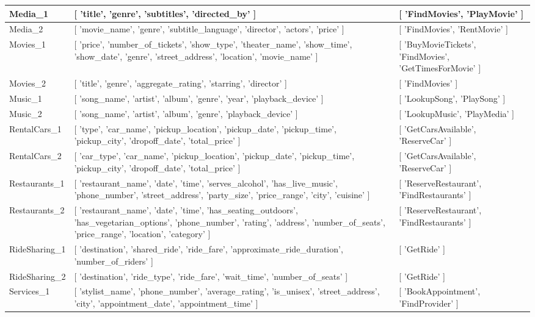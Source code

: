\begin{tabularx}{\linewidth}{|l|L|L|}
    Media\_1 & [ 'title', 'genre', 'subtitles', 'directed\_by' ] & [ 'FindMovies', 'PlayMovie' ] \\ \hline
    Media\_2 & [ 'movie\_name', 'genre', 'subtitle\_language', 'director', 'actors', 'price' ] & [ 'FindMovies', 'RentMovie' ] \\ \hline
    Movies\_1 & [ 'price', 'number\_of\_tickets', 'show\_type', 'theater\_name', 'show\_time', 'show\_date', 'genre', 'street\_address', 'location', 'movie\_name' ] & [ 'BuyMovieTickets', 'FindMovies', 'GetTimesForMovie' ] \\ \hline
    Movies\_2 & [ 'title', 'genre', 'aggregate\_rating', 'starring', 'director' ] & [ 'FindMovies' ] \\ \hline
    Music\_1 & [ 'song\_name', 'artist', 'album', 'genre', 'year', 'playback\_device' ] & [ 'LookupSong', 'PlaySong' ] \\ \hline
    Music\_2 & [ 'song\_name', 'artist', 'album', 'genre', 'playback\_device' ] & [ 'LookupMusic', 'PlayMedia' ] \\ \hline
    RentalCars\_1 & [ 'type', 'car\_name', 'pickup\_location', 'pickup\_date', 'pickup\_time', 'pickup\_city', 'dropoff\_date', 'total\_price' ] & [ 'GetCarsAvailable', 'ReserveCar' ] \\ \hline
    RentalCars\_2 & [ 'car\_type', 'car\_name', 'pickup\_location', 'pickup\_date', 'pickup\_time', 'pickup\_city', 'dropoff\_date', 'total\_price' ] & [ 'GetCarsAvailable', 'ReserveCar' ] \\ \hline
    Restaurants\_1 & [ 'restaurant\_name', 'date', 'time', 'serves\_alcohol', 'has\_live\_music', 'phone\_number', 'street\_address', 'party\_size', 'price\_range', 'city', 'cuisine' ] & [ 'ReserveRestaurant', 'FindRestaurants' ] \\ \hline
    Restaurants\_2 & [ 'restaurant\_name', 'date', 'time', 'has\_seating\_outdoors', 'has\_vegetarian\_options', 'phone\_number', 'rating', 'address', 'number\_of\_seats', 'price\_range', 'location', 'category' ] & [ 'ReserveRestaurant', 'FindRestaurants' ] \\ \hline
    RideSharing\_1 & [ 'destination', 'shared\_ride', 'ride\_fare', 'approximate\_ride\_duration', 'number\_of\_riders' ] & [ 'GetRide' ] \\ \hline
    RideSharing\_2 & [ 'destination', 'ride\_type', 'ride\_fare', 'wait\_time', 'number\_of\_seats' ] & [ 'GetRide' ] \\ \hline
    Services\_1 & [ 'stylist\_name', 'phone\_number', 'average\_rating', 'is\_unisex', 'street\_address', 'city', 'appointment\_date', 'appointment\_time' ] & [ 'BookAppointment', 'FindProvider' ] \\ \hline

\end{tabularx}
